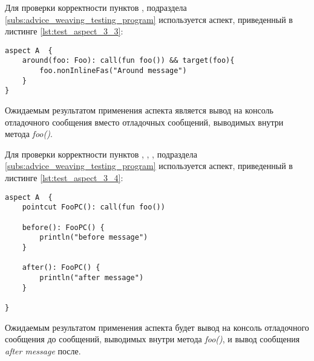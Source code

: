 Для проверки корректности пунктов \quotes{\ref{list:around_advice_weaving_check}},
\quotes{\ref{list:program_work_check}}  подраздела \ref{subs:advice_weaving_testing_program} используется аспект, приведенный в листинге \ref{lst:test_aspect_3_3}:
\begin{lstlisting}[style={java}, label={lst:test_aspect_3_3},
  caption={Пример тестового аспекта}]
aspect A  {
    around(foo: Foo): call(fun foo()) && target(foo){
        foo.nonInlineFas("Around message")
    }
}
\end{lstlisting}
Ожидаемым результатом применения аспекта является вывод на консоль отладочного сообщения  вместо отладочных сообщений, выводимых внутри метода \textit{foo()}.

Для проверки корректности пунктов \quotes{\ref{list:before_advice_weaving_check}},
\quotes{\ref{list:after_advice_weaving_check}},
\quotes{\ref{list:several_advices_weaving_check}},
\quotes{\ref{list:program_work_check}}  подраздела \ref{subs:advice_weaving_testing_program} используется аспект, приведенный в листинге \ref{lst:test_aspect_3_4}:
\begin{lstlisting}[style={java}, label={lst:test_aspect_3_4},
  caption={Пример тестового аспекта}]
aspect A  {
    pointcut FooPC(): call(fun foo())

    before(): FooPC() {
        println("before message")
    }

    after(): FooPC() {
        println("after message")
    }

}
\end{lstlisting}
Ожидаемым результатом применения аспекта будет вывод на консоль отладочного сообщения  до сообщений, выводимых внутри метода \textit{foo()}, и вывод сообщения \textit{after message} после.
